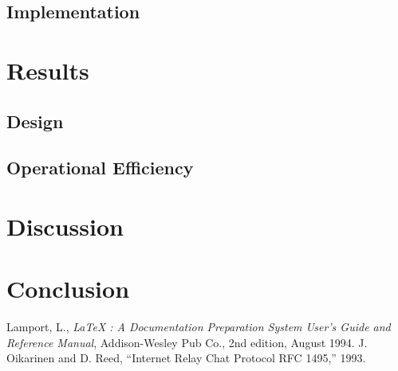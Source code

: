 \documentclass{article}
\begin{document}
\subsection{Implementation}

\section{Results}
\subsection{Design}
\subsection{Operational Efficiency}
\subsection{}

\section{Discussion}

\section{Conclusion}

\begin{thebibliography}{99}
 Lamport, L., {\it LaTeX : A Documentation
 Preparation System User's Guide and Reference Manual}, Addison-Wesley 
 Pub Co., 2nd edition, August 1994.
 J. Oikarinen and D. Reed, “Internet Relay Chat Protocol
RFC 1495,” 1993.
\end{thebibliography}
 
\end{document}
